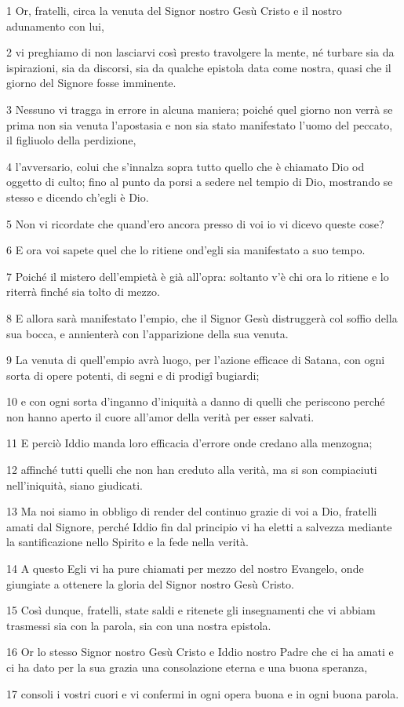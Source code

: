\par 1 Or, fratelli, circa la venuta del Signor nostro Gesù Cristo e il nostro adunamento con lui,
\par 2 vi preghiamo di non lasciarvi così presto travolgere la mente, né turbare sia da ispirazioni, sia da discorsi, sia da qualche epistola data come nostra, quasi che il giorno del Signore fosse imminente.
\par 3 Nessuno vi tragga in errore in alcuna maniera; poiché quel giorno non verrà se prima non sia venuta l'apostasia e non sia stato manifestato l'uomo del peccato, il figliuolo della perdizione,
\par 4 l'avversario, colui che s'innalza sopra tutto quello che è chiamato Dio od oggetto di culto; fino al punto da porsi a sedere nel tempio di Dio, mostrando se stesso e dicendo ch'egli è Dio.
\par 5 Non vi ricordate che quand'ero ancora presso di voi io vi dicevo queste cose?
\par 6 E ora voi sapete quel che lo ritiene ond'egli sia manifestato a suo tempo.
\par 7 Poiché il mistero dell'empietà è già all'opra: soltanto v'è chi ora lo ritiene e lo riterrà finché sia tolto di mezzo.
\par 8 E allora sarà manifestato l'empio, che il Signor Gesù distruggerà col soffio della sua bocca, e annienterà con l'apparizione della sua venuta.
\par 9 La venuta di quell'empio avrà luogo, per l'azione efficace di Satana, con ogni sorta di opere potenti, di segni e di prodigî bugiardi;
\par 10 e con ogni sorta d'inganno d'iniquità a danno di quelli che periscono perché non hanno aperto il cuore all'amor della verità per esser salvati.
\par 11 E perciò Iddio manda loro efficacia d'errore onde credano alla menzogna;
\par 12 affinché tutti quelli che non han creduto alla verità, ma si son compiaciuti nell'iniquità, siano giudicati.
\par 13 Ma noi siamo in obbligo di render del continuo grazie di voi a Dio, fratelli amati dal Signore, perché Iddio fin dal principio vi ha eletti a salvezza mediante la santificazione nello Spirito e la fede nella verità.
\par 14 A questo Egli vi ha pure chiamati per mezzo del nostro Evangelo, onde giungiate a ottenere la gloria del Signor nostro Gesù Cristo.
\par 15 Così dunque, fratelli, state saldi e ritenete gli insegnamenti che vi abbiam trasmessi sia con la parola, sia con una nostra epistola.
\par 16 Or lo stesso Signor nostro Gesù Cristo e Iddio nostro Padre che ci ha amati e ci ha dato per la sua grazia una consolazione eterna e una buona speranza,
\par 17 consoli i vostri cuori e vi confermi in ogni opera buona e in ogni buona parola.

